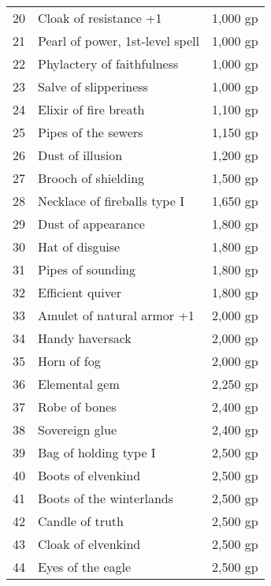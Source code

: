\begin{xtabular}{lll}
20  & Cloak of resistance +1                      & 1,000 gp     \\
21  & Pearl of power, 1st-level spell             & 1,000 gp     \\
22  & Phylactery of faithfulness                  & 1,000 gp     \\
23  & Salve of slipperiness                       & 1,000 gp     \\
24  & Elixir of fire breath                       & 1,100 gp     \\
25  & Pipes of the sewers                         & 1,150 gp     \\
26  & Dust of illusion                            & 1,200 gp     \\
27  & Brooch of shielding                         & 1,500 gp     \\
28  & Necklace of fireballs type I                & 1,650 gp     \\
29  & Dust of appearance                          & 1,800 gp     \\
30  & Hat of disguise                             & 1,800 gp     \\
31  & Pipes of sounding                           & 1,800 gp     \\
32  & Efficient quiver                            & 1,800 gp     \\
33  & Amulet of natural armor +1                  & 2,000 gp     \\
34  & Handy haversack                             & 2,000 gp     \\
35  & Horn of fog                                 & 2,000 gp     \\
36  & Elemental gem                               & 2,250 gp     \\
37  & Robe of bones                               & 2,400 gp     \\
38  & Sovereign glue                              & 2,400 gp     \\
39  & Bag of holding type I                       & 2,500 gp     \\
40  & Boots of elvenkind                          & 2,500 gp     \\
41  & Boots of the winterlands                    & 2,500 gp     \\
42  & Candle of truth                             & 2,500 gp     \\
43  & Cloak of elvenkind                          & 2,500 gp     \\
44  & Eyes of the eagle                           & 2,500 gp     \\

\end{xtabular}
